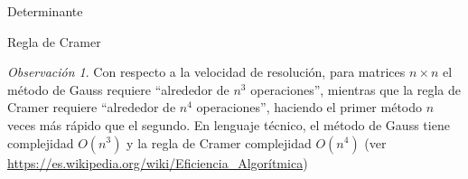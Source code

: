 \documentclass[a4paper,12pt,twoside,spanish,reqno]{amsbook}
\theoremstyle{definition}
\theoremstyle{remark}
\newtheorem{observacion}{Observaci\'on}[section]
\begin{document}
\begin{chapter}{Determinante}
\begin{section}{Regla de Cramer}
\begin{observacion}
		 		Con respecto a la velocidad  de resolución, para matrices $n \times n$ el método de Gauss requiere ``alrededor de $n^3$ operaciones'', mientras que la regla de Cramer requiere ``alrededor de $n^4$ operaciones'', haciendo el primer método $n$ veces más rápido que el segundo. En  lenguaje técnico, el método de Gauss tiene complejidad $O(n^3)$ y la regla de Cramer complejidad $O(n^4)$ (ver
		 		\href{ https://es.wikipedia.org/wiki/Eficiencia\_Algorítmica}{ https://es.wikipedia.org/wiki/Eficiencia\_Algorítmica}) 
		 	\end{observacion}
		 	
		 \end{section}
	\end{chapter}
	

\printindex
\end{document}
